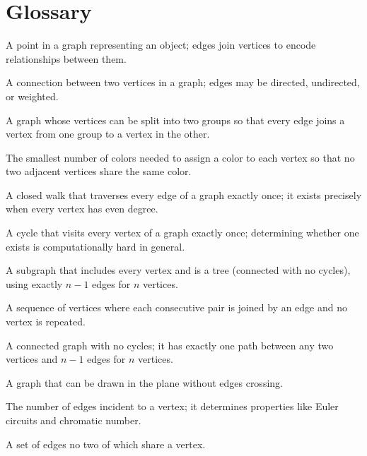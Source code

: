 \section*{Glossary}
\begin{description}[leftmargin=*,style=nextline,itemsep=0.3em]
\item[\textbf{Vertex.}] A point in a graph representing an object; edges join vertices to encode relationships between them.
\item[\textbf{Edge.}] A connection between two vertices in a graph; edges may be directed, undirected, or weighted.
\item[\textbf{Bipartite graph.}] A graph whose vertices can be split into two groups so that every edge joins a vertex from one group to a vertex in the other.
\item[\textbf{Chromatic number.}] The smallest number of colors needed to assign a color to each vertex so that no two adjacent vertices share the same color.
\item[\textbf{Eulerian circuit.}] A closed walk that traverses every edge of a graph exactly once; it exists precisely when every vertex has even degree.
\item[\textbf{Hamiltonian cycle.}] A cycle that visits every vertex of a graph exactly once; determining whether one exists is computationally hard in general.
\item[\textbf{Spanning tree.}] A subgraph that includes every vertex and is a tree (connected with no cycles), using exactly $n-1$ edges for $n$ vertices.
\item[\textbf{Path.}] A sequence of vertices where each consecutive pair is joined by an edge and no vertex is repeated.
\item[\textbf{Tree.}] A connected graph with no cycles; it has exactly one path between any two vertices and $n-1$ edges for $n$ vertices.
\item[\textbf{Planar graph.}] A graph that can be drawn in the plane without edges crossing.
\item[\textbf{Degree.}] The number of edges incident to a vertex; it determines properties like Euler circuits and chromatic number.
\item[\textbf{Matching.}] A set of edges no two of which share a vertex.
\end{description}
